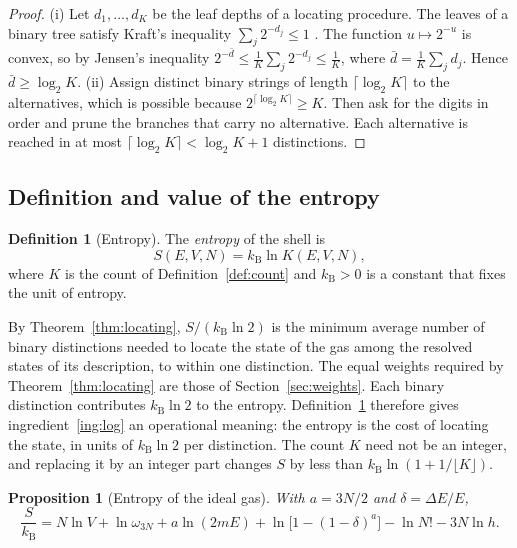 \documentclass[11pt,a4paper]{article}
\newtheorem{proposition}[theorem]{Proposition}
\theoremstyle{definition}
\newtheorem{definition}[theorem]{Definition}
\theoremstyle{remark}
\newcommand{\kB}{k_{\mathrm{B}}}
\begin{document}
\begin{proof}
(i) Let $d_1,\dots,d_K$ be the leaf depths of a locating procedure.
The leaves of a binary tree satisfy Kraft's inequality $\sum_{j}2^{-d_j}\le1$ \citep{kraft1949,cover2006}.
The function $u\mapsto2^{-u}$ is convex, so by Jensen's inequality $2^{-\bar d}\le\frac1K\sum_j2^{-d_j}\le\frac1K$, where $\bar d=\frac1K\sum_jd_j$.
Hence $\bar d\ge\log_2K$.
(ii) Assign distinct binary strings of length $\lceil\log_2K\rceil$ to the alternatives, which is possible because $2^{\lceil\log_2K\rceil}\ge K$.
Then ask for the digits in order and prune the branches that carry no alternative.
Each alternative is reached in at most $\lceil\log_2K\rceil<\log_2K+1$ distinctions.
\end{proof}

\subsection{Definition and value of the entropy}

\begin{definition}[Entropy]
\label{def:entropy}
The \emph{entropy} of the shell is
\begin{equation}
S(E,V,N)=\kB\ln K(E,V,N),
\label{eq:entropy}
\end{equation}
where $K$ is the count of Definition~\ref{def:count} and $\kB>0$ is a constant that fixes the unit of entropy.
\end{definition}

By Theorem~\ref{thm:locating}, $S/(\kB\ln2)$ is the minimum average number of binary distinctions needed to locate the state of the gas among the resolved states of its description, to within one distinction.
The equal weights required by Theorem~\ref{thm:locating} are those of Section~\ref{sec:weights}.
Each binary distinction contributes $\kB\ln2$ to the entropy.
Definition~\ref{def:entropy} therefore gives ingredient~\ref{ing:log} an operational meaning: the entropy is the cost of locating the state, in units of $\kB\ln2$ per distinction.
The count $K$ need not be an integer, and replacing it by an integer part changes $S$ by less than $\kB\ln(1+1/\lfloor K\rfloor)$.

\begin{proposition}[Entropy of the ideal gas]
\label{prop:entropy-explicit}
With $a=3N/2$ and $\delta=\Delta E/E$,
\begin{equation}
\frac{S}{\kB}=N\ln V+\ln\omega_{3N}+a\ln(2mE)+\ln\bigl[1-(1-\delta)^{a}\bigr]-\ln N!-3N\ln h.
\label{eq:entropy-explicit}
\end{equation}
\end{proposition}
\end{document}
